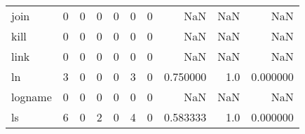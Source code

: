 \begin{longtable}{lrrrrrrrrr}
join      &                                       0 &                                                  0 &                                                  0 &                                                  0 &                                                  0 &                                                  0 &                                                NaN &                                    NaN &                                  NaN \\
kill      &                                       0 &                                                  0 &                                                  0 &                                                  0 &                                                  0 &                                                  0 &                                                NaN &                                    NaN &                                  NaN \\
link      &                                       0 &                                                  0 &                                                  0 &                                                  0 &                                                  0 &                                                  0 &                                                NaN &                                    NaN &                                  NaN \\
ln        &                                       3 &                                                  0 &                                                  0 &                                                  0 &                                                  3 &                                                  0 &                                           0.750000 &                                    1.0 &                             0.000000 \\
logname   &                                       0 &                                                  0 &                                                  0 &                                                  0 &                                                  0 &                                                  0 &                                                NaN &                                    NaN &                                  NaN \\
ls        &                                       6 &                                                  0 &                                                  2 &                                                  0 &                                                  4 &                                                  0 &                                           0.583333 &                                    1.0 &                             0.000000 \\

\end{longtable}
